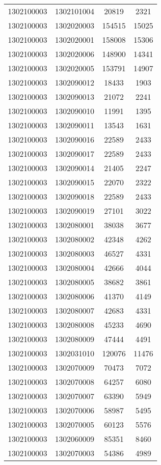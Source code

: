 \begin{longtable}{llcc}
1302100003 & 1302101004 & 20819 & 2321\\
1302100003 & 1302020003 & 154515 & 15025\\
1302100003 & 1302020001 & 158008 & 15306\\
1302100003 & 1302020006 & 148900 & 14341\\
1302100003 & 1302020005 & 153791 & 14907\\
1302100003 & 1302090012 & 18433 & 1903\\
1302100003 & 1302090013 & 21072 & 2241\\
1302100003 & 1302090010 & 11991 & 1395\\
1302100003 & 1302090011 & 13543 & 1631\\
1302100003 & 1302090016 & 22589 & 2433\\
1302100003 & 1302090017 & 22589 & 2433\\
1302100003 & 1302090014 & 21405 & 2247\\
1302100003 & 1302090015 & 22070 & 2322\\
1302100003 & 1302090018 & 22589 & 2433\\
1302100003 & 1302090019 & 27101 & 3022\\
1302100003 & 1302080001 & 38038 & 3677\\
1302100003 & 1302080002 & 42348 & 4262\\
1302100003 & 1302080003 & 46527 & 4331\\
1302100003 & 1302080004 & 42666 & 4044\\
1302100003 & 1302080005 & 38682 & 3861\\
1302100003 & 1302080006 & 41370 & 4149\\
1302100003 & 1302080007 & 42683 & 4331\\
1302100003 & 1302080008 & 45233 & 4690\\
1302100003 & 1302080009 & 47444 & 4491\\
1302100003 & 1302031010 & 120076 & 11476\\
1302100003 & 1302070009 & 70473 & 7072\\
1302100003 & 1302070008 & 64257 & 6080\\
1302100003 & 1302070007 & 63390 & 5949\\
1302100003 & 1302070006 & 58987 & 5495\\
1302100003 & 1302070005 & 60123 & 5576\\
1302100003 & 1302060009 & 85351 & 8460\\
1302100003 & 1302070003 & 54386 & 4989\\

\end{longtable}
